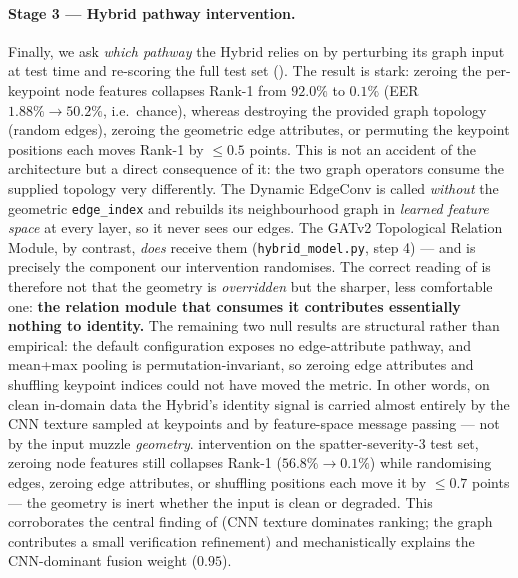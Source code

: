 \documentclass[11pt]{article}
\begin{document}
\paragraph{Stage 3 --- Hybrid pathway intervention.}
Finally, we ask \emph{which pathway} the Hybrid relies on by perturbing its graph input at
test time and re-scoring the full test set (). The result is stark:
zeroing the per-keypoint node features collapses Rank-1 from $92.0\%$ to $0.1\%$ (EER
$1.88\%\to50.2\%$, i.e.\ chance), whereas destroying the provided graph topology (random
edges), zeroing the geometric edge attributes, or permuting the keypoint positions each moves
Rank-1 by $\le 0.5$ points. This is not an accident of the architecture but a direct
consequence of it: the two graph operators consume the supplied topology very differently. The Dynamic EdgeConv is called \emph{without} the geometric \texttt{edge{\_}index} and rebuilds its neighbourhood graph in \emph{learned feature space} at every layer, so it never sees our edges. The GATv2 Topological Relation Module, by contrast, \emph{does} receive them (\texttt{hybrid{\_}model.py}, step 4) --- and is precisely the component our intervention randomises. The correct reading of  is therefore not that the geometry is \emph{overridden} but the sharper, less comfortable one: \textbf{the relation module that consumes it contributes essentially nothing to identity.} The remaining two null results are structural rather than empirical: the default configuration exposes no edge-attribute pathway, and mean+max pooling is permutation-invariant, so zeroing edge attributes and shuffling keypoint indices could not have moved the metric. In other words, on clean in-domain data the Hybrid's identity signal is carried almost entirely by the CNN texture sampled at keypoints and by feature-space message passing --- not by the input muzzle \emph{geometry}.
intervention on the spatter-severity-3 test set, zeroing node features still collapses Rank-1
($56.8\%\to0.1\%$) while randomising edges, zeroing edge attributes, or shuffling positions
each move it by $\le0.7$ points --- the geometry is inert whether the input is clean or
degraded. This corroborates the central finding of  (CNN texture dominates
ranking; the graph contributes a small verification refinement) and mechanistically explains
the CNN-dominant fusion weight ($0.95$).
\end{document}
